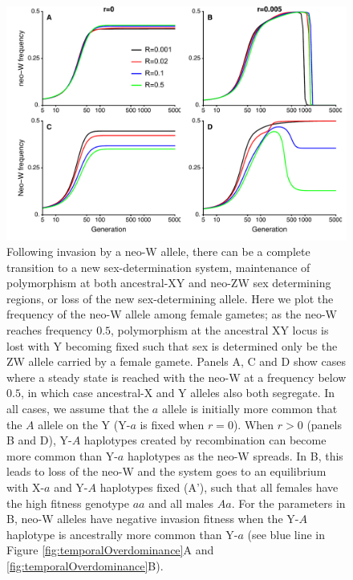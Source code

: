 \documentclass[12pt]{article}
\begin{document}
\newpage

\begin{figure}[!h]
\centering
\centerline{\includegraphics[width=\linewidth]{Temporal_Overdominance_Mike}}
\caption{
Following invasion by a neo-W allele, there can be a complete transition to a new sex-determination system, maintenance of polymorphism at both ancestral-XY and neo-ZW sex determining regions, or loss of the new sex-determining allele. 
Here we plot the frequency of the neo-W allele among female gametes; as the neo-W reaches frequency $0.5$, polymorphism at the ancestral XY locus is lost with Y becoming fixed such that sex is determined only be the ZW allele carried by a female gamete. 
Panels A, C and D show cases where a steady state is reached with the neo-W at a frequency below $0.5$, in which case ancestral-X and Y alleles also both segregate. 
In all cases, we assume that the $a$ allele is initially more common that the $A$ allele on the Y (Y-$a$ is fixed when $r=0$). 
When $r>0$ (panels B and D), Y-$A$ haplotypes created by recombination can become more common than Y-$a$ haplotypes as the neo-W spreads.
In B, this leads to loss of the neo-W and the system goes to an equilibrium with X-$a$ and Y-$A$ haplotypes fixed (A'), such that all females have the high fitness genotype $aa$ and all males $Aa$. 
For the parameters in B, neo-W alleles have negative invasion fitness when the Y-$A$ haplotype is ancestrally more common than Y-$a$ (see blue line in Figure \ref{fig:temporalOverdominance}A and  \ref{fig:temporalOverdominance}B). 
}
\end{figure}
\end{document}
